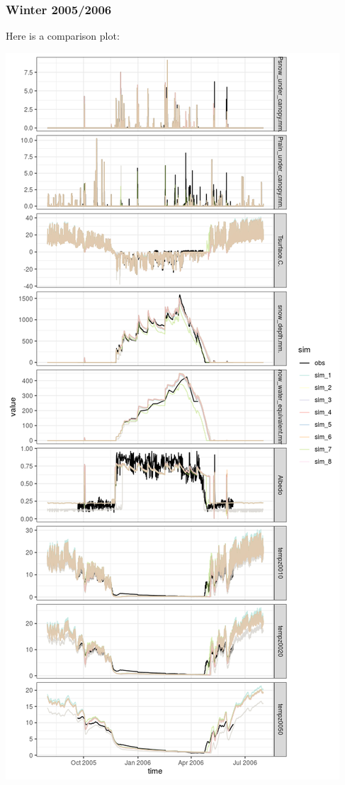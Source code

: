 \documentclass[
]{article}
\begin{document}
\hypertarget{winter-20052006}{%
\subsubsection{Winter 2005/2006}\label{winter-20052006}}

Here is a comparison plot:

\includegraphics{coldelaporte_v6_files/figure-latex/Winter_2005_2006-1.png}
\end{document}
